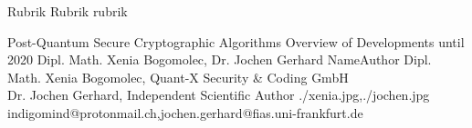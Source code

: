 \documentclass[a4paper,11pt]{article}
\begin{document}
\setcounter{footnote}{0}
\setcounter{figure}{0}


\Abschnitt
{Rubrik}
{Rubrik}
{rubrik}

\vspace{3mm}


\Aufsatz
{Post-Quantum Secure Cryptographic Algorithms}
{Overview of Developments until 2020}
{Dipl. Math. Xenia Bogomolec, Dr. Jochen Gerhard}
{NameAuthor}
{Dipl. Math. Xenia Bogomolec, Quant-X Security \& Coding GmbH\\ 
Dr. Jochen Gerhard, Independent Scientific Author}
{./xenia.jpg,./jochen.jpg}
{indigomind@protonmail.ch,jochen.gerhard@fias.uni-frankfurt.de}
\end{document}
